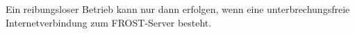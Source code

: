Ein reibungsloser Betrieb kann nur dann erfolgen, wenn eine unterbrechungsfreie Internetverbindung zum \gls{FROST-Server} besteht.









































































































































%
